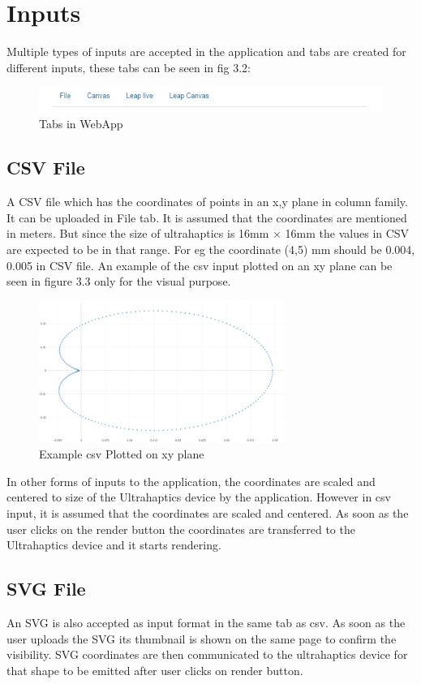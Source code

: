 \section{Inputs}
Multiple types of inputs are accepted in the application and tabs are 
created for different inputs, these tabs can be seen in fig 3.2:
\begin{figure}[htb]
	\includegraphics[width=140mm]{gfx/tabs.jpeg}
	\caption{Tabs in WebApp}
	\label{fig:features:tabs}
\end{figure}


\subsection*{CSV File}
A CSV file which has the coordinates of points in an x,y plane in column family. 
It can be uploaded in File tab. It is assumed that 
the coordinates are mentioned in meters. But since the size of ultrahaptics is 16mm $\times$  16mm
the values in CSV are expected to be in that range. For eg the coordinate (4,5) mm 
should be 0.004, 0.005 in CSV file. An example of the csv input plotted on an xy plane 
can be seen in figure 3.3 only for the visual purpose. \\
\begin{figure}[htb]
	\includegraphics[width=80mm]{gfx/csvinput.jpeg}
	\caption{Example csv Plotted on xy plane}
	\label{fig:features:csvinput}
\end{figure}
In other forms of inputs to the application, the 
coordinates are scaled and centered to size of the Ultrahaptics device by the application. 
However in csv input, it is assumed that the coordinates are scaled and centered.
As soon as the user clicks on the render button the coordinates are 
transferred to the Ultrahaptics device and it starts rendering.


\subsection*{SVG File}
An SVG is also accepted as input format in the same tab as csv. 
As soon as the user uploads the SVG its thumbnail is shown on the 
same page to confirm the visibility. 
SVG coordinates are then communicated to the ultrahaptics device for that shape to
be emitted after user clicks on render button. 


